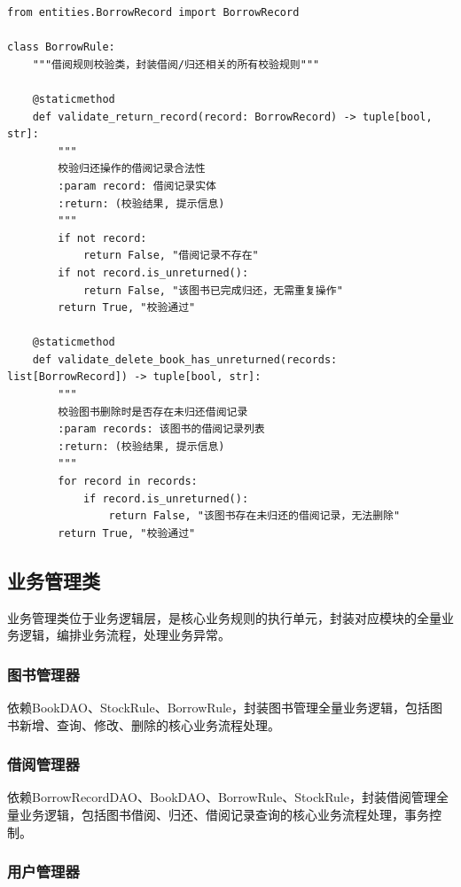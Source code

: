 \documentclass[12pt, a4paper]{article}
\begin{document}
\begin{verbatim}
from entities.BorrowRecord import BorrowRecord

class BorrowRule:
    """借阅规则校验类，封装借阅/归还相关的所有校验规则"""

    @staticmethod
    def validate_return_record(record: BorrowRecord) -> tuple[bool, str]:
        """
        校验归还操作的借阅记录合法性
        :param record: 借阅记录实体
        :return: (校验结果, 提示信息)
        """
        if not record:
            return False, "借阅记录不存在"
        if not record.is_unreturned():
            return False, "该图书已完成归还，无需重复操作"
        return True, "校验通过"

    @staticmethod
    def validate_delete_book_has_unreturned(records: list[BorrowRecord]) -> tuple[bool, str]:
        """
        校验图书删除时是否存在未归还借阅记录
        :param records: 该图书的借阅记录列表
        :return: (校验结果, 提示信息)
        """
        for record in records:
            if record.is_unreturned():
                return False, "该图书存在未归还的借阅记录，无法删除"
        return True, "校验通过"
\end{verbatim}

\subsection{业务管理类}

业务管理类位于业务逻辑层，是核心业务规则的执行单元，封装对应模块的全量业务逻辑，编排业务流程，处理业务异常。

\subsubsection{图书管理器}

依赖BookDAO、StockRule、BorrowRule，封装图书管理全量业务逻辑，包括图书新增、查询、修改、删除的核心业务流程处理。

\subsubsection{借阅管理器}

依赖BorrowRecordDAO、BookDAO、BorrowRule、StockRule，封装借阅管理全量业务逻辑，包括图书借阅、归还、借阅记录查询的核心业务流程处理，事务控制。

\subsubsection{用户管理器}
\end{document}
